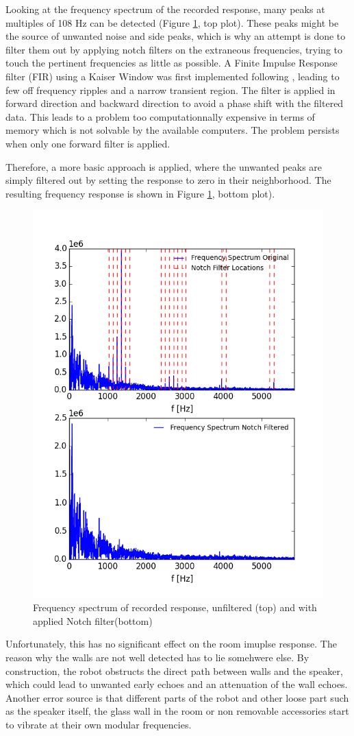 Looking at the frequency spectrum of the recorded response, many peaks at multiples of 108 Hz can be detected (Figure \ref{fig:RIR_filtered}, top plot). 
These peaks might be the source of unwanted noise and side peaks, which is why an attempt is done to filter them out by applying notch filters on the extraneous frequencies, trying to touch the pertinent frequencies as little as possible. A Finite Impulse Response filter (FIR) using a Kaiser Window was first implemented following \cite{Notch}, leading to few off frequency ripples and a narrow transient region. The filter is applied in forward direction and backward direction to avoid a phase shift with the filtered data. This leads to a problem too computationnally expensive in terms of memory which is not solvable by the available computers. 
The problem persists when only one forward filter is applied. 

Therefore, a more basic approach is applied, where the unwanted peaks are simply filtered out by setting the response to zero in their neighborhood. The resulting frequency response is shown in Figure \ref{fig:RIR_filtered}, bottom plot). 

\begin{figure}[htb]
    \centering
    \includegraphics[width=.5\linewidth]{files/NotchY.png}
    \caption{Frequency spectrum of recorded response, unfiltered (top) and with applied Notch filter(bottom)}
    \label{fig:RIR_filtered}
\end{figure}

Unfortunately, this has no significant effect on the room imuplse response.
The reason why the walls are not well detected has to lie somehwere else. 
By construction, the robot obstructs the direct path between walls and the speaker, which could lead to unwanted early echoes and an attenuation of the wall echoes.
Another error source is that different parts of the robot and other loose part such as the speaker itself, the glass wall in the room or non removable accessories start to vibrate at their own modular frequencies.

